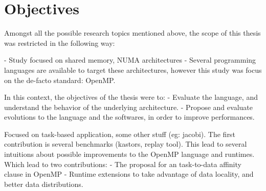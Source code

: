\section{Objectives}\label{sec:intro:objectives}

Amongst all the possible research topics mentioned above, the scope of this thesis was restricted in the following way:

- Study focused on shared memory, NUMA architectures
- Several programming languages are available to target these architectures, however this study was focus on the de-facto standard: OpenMP.

In this context, the objectives of the thesis were to:
 - Evaluate the language, and understand the behavior of the underlying architecture.
 - Propose and evaluate evolutions to the language and the softwares, in order to improve performances.


Focused on task-based application, some other stuff (eg: jacobi).
The first contribution is several benchmarks (kastors, replay tool).
This lead to several intuitions about possible improvements to the OpenMP language and runtimes.
Which lead to two contributions:
 - The proposal for an task-to-data affinity clause in OpenMP
 - Runtime extensions to take advantage of data locality, and better data distributions.




